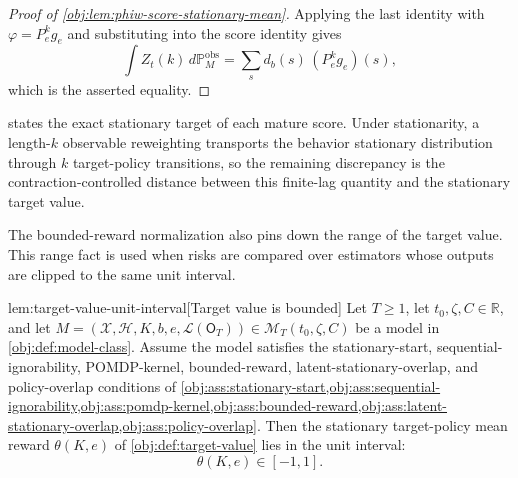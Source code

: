 \documentclass[11pt]{article}
\begin{document}
\begin{proof}[Proof of \cref{obj:lem:phiw-score-stationary-mean}]
Applying the last identity with \(\varphi=P_e^k g_e\) and substituting into the score identity gives
\[
\int Z_t(k)\,d\mathbb P_M^{\mathrm{obs}}
=
\sum_s d_b(s)\,(P_e^k g_e)(s),
\]
which is the asserted equality.
\end{proof}

 states the exact stationary target of each mature score. Under stationarity, a length-\(k\) observable reweighting transports the behavior stationary distribution through \(k\) target-policy transitions, so the remaining discrepancy is the contraction-controlled distance between this finite-lag quantity and the stationary target value.

The bounded-reward normalization also pins down the range of the target value. This range fact is used when risks are compared over estimators whose outputs are clipped to the same unit interval.

\begin{lemmav}{lem:target-value-unit-interval}[Target value is bounded]
Let \(T\ge 1\), let \(t_0,\zeta,C\in\mathbb R\), and let
\(M=(\mathcal X,\mathcal H,K,b,e,\mathcal L(\mathsf O_T))\in
\mathcal M_T(t_0,\zeta,C)\) be a model in \cref{obj:def:model-class}. Assume the model satisfies the stationary-start, sequential-ignorability, POMDP-kernel, bounded-reward, latent-stationary-overlap, and policy-overlap conditions of
\cref{obj:ass:stationary-start,obj:ass:sequential-ignorability,obj:ass:pomdp-kernel,obj:ass:bounded-reward,obj:ass:latent-stationary-overlap,obj:ass:policy-overlap}. Then the stationary target-policy mean reward \(\theta(K,e)\) of \cref{obj:def:target-value} lies in the unit interval:
\[
\theta(K,e)\in[-1,1].
\]
\end{lemmav}
\end{document}
